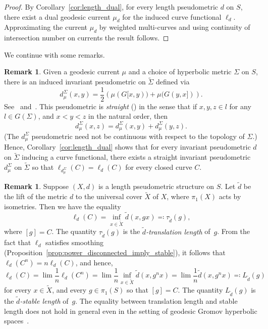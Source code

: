 \documentclass[11pt]{amsart}
\numberwithin{equation}{section}
\numberwithin{figure}{section}
\theoremstyle{definition}
\newtheorem{remark}[theorem]{Remark}
\theoremstyle{plain}
\newcommand*{\wt}[1]{\widetilde{#1}}
\begin{document}
\begin{proof}
By Corollary~\ref{cor:length_dual}, for every length pseudometric $d$ on $S$, there exist a dual geodesic current $\mu_d$ for the induced curve functional $\ell_d$.
Approximating the current $\mu_d$ by weighted multi-curves and using continuity of intersection number on currents the result follows.
\end{proof}

We continue with some remarks.

\begin{remark}\label{rmk:pseudo_metrics}
Given a geodesic current $\mu$ and a choice of hyperbolic metric $\Sigma$ on $S$, there is an induced invariant pseudometric on $\wt{\Sigma}$ defined via
\[
d_\mu^\Sigma(x,y) = \frac{1}{2}\left(\mu(G[x,y)) + \mu(G(y,x])\right).
\]
See~\cite[Section~4]{BIPP21:Systoles} and~\cite{dRMG22:Duals}. This pseudometric is \emph{straight} (\cite[Proposition~4.1]{BIPP21:Systoles}) in the sense that if $x,y,z \in l$ for any $l \in G(\Sigma)$, and $x<y<z$ in the natural order, then
\[
d_\mu^\Sigma(x,z)=d_\mu^\Sigma(x,y)+d_\mu^\Sigma(y,z).
\]
(The $d_\mu^\Sigma$ pseudometric need not be continuous with respect to the topology of $\Sigma$.)
Hence, Corollary~\ref{cor:length_dual} shows that for every invariant
pseudometric $d$ on $\wt{\Sigma}$ inducing a curve functional, there
exists a straight invariant pseudometric $d_\mu^\Sigma$ on
$\wt{\Sigma}$ so that $\ell_{d_\mu^\Sigma}(C)=\ell_{d}(C)$ for every
closed curve $C$.
\end{remark}
\begin{remark}
Suppose $(X,d)$ is a length pseudometric structure on $S$. Let $\wt{d}$ be the lift of the metric $d$ to the universal cover $\wt{X}$ of $X$, where $\pi_1(X)$ acts by isometries. Then we have the equality~\cite[8.3.13]{BBI01:MetricGeometry}  \[\ell_d(C)=\inf_{x \in \wt{X}} \wt{d}(x, g x) \eqqcolon \tau_{\wt{d}}(g),\]
where $[g]=C$. The quantity $\tau_{\wt{d}}(g)$ is the \emph{$\wt{d}$-translation length} of~$g$.
From the fact that $\ell_d$ satisfies smoothing (Proposition~\ref{prop:power_disconnected_imply_stable}), it follows that $\ell_d(C^n)=n\ell_d(C)$, and hence,
\[
\ell_d(C)=\lim \frac{1}{n} \ell_d(C^n) = \lim \frac{1}{n} \inf_{x \in \wt{X}} \wt{d}(x, g^n x) = \lim \frac{1}{n} \wt{d}(x,g^n x) \eqqcolon L_{\wt{d}}(g)
\]
for every $x \in \wt{X}$, and every $g \in \pi_1(S)$ so that $[g]=C$.
The quantity $L_{\wt{d}}(g)$ is the \emph{$\wt{d}$-stable length} of~$g$.
The equality between translation length and stable length does not hold in general even in the setting of geodesic Gromov hyperbolic spaces~\cite[Proposition~6.4]{CDP90:Lectures}.
\end{remark}
\end{document}
